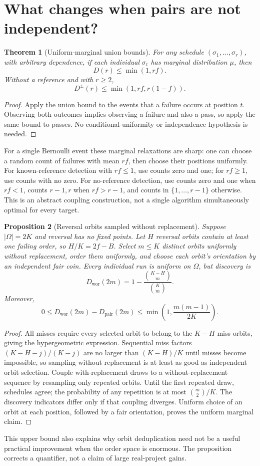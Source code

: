 \documentclass[11pt,a4paper]{article}
\newtheorem{theorem}{Theorem}[section]
\newtheorem{proposition}[theorem]{Proposition}
\theoremstyle{definition}\newtheorem{definition}[theorem]{Definition}
\theoremstyle{remark}\newtheorem{remark}[theorem]{Remark}
\newcommand{\PAIR}{\mathrm{pair}}
\theoremstyle{definition}\newtheorem{xexample}[xtheorem]{Example}\theoremstyle{plain}
\begin{document}
\section{What changes when pairs are not independent?}\label{sec:orbits}
\begin{theorem}[Uniform-marginal union bounds]\label{thm:union}
For any schedule $(\sigma_1,\ldots,\sigma_r)$, with arbitrary dependence, if each individual $\sigma_t$ has marginal distribution $\mu$, then
\[
 D(r)\le\min(1,rf).
\]
Without a reference and with $r\ge2$,
\[
 D^\pm(r)\le\min(1,rf,r(1-f)).
\]
\end{theorem}
\begin{proof}
Apply the union bound to the events that a failure occurs at position $t$. Observing both outcomes implies observing a failure and also a pass, so apply the same bound to passes. No conditional-uniformity or independence hypothesis is needed.
\end{proof}
For a single Bernoulli event these marginal relaxations are sharp: one can choose a random count of failures with mean $rf$, then choose their positions uniformly. For known-reference detection with $rf\le1$, use counts zero and one; for $rf\ge1$, use counts with no zero. For no-reference detection, use counts zero and one when $rf<1$, counts $r-1,r$ when $rf>r-1$, and counts in $\{1,\ldots,r-1\}$ otherwise. This is an abstract coupling construction, not a single algorithm simultaneously optimal for every target.

\begin{proposition}[Reversal orbits sampled without replacement]\label{prop:wor}
Suppose $|\Omega|=2K$ and reversal has no fixed points. Let $H$ reversal orbits contain at least one failing order, so $H/K=2f-B$. Select $m\le K$ distinct orbits uniformly without replacement, order them uniformly, and choose each orbit's orientation by an independent fair coin. Every individual run is uniform on $\Omega$, but discovery is
\begin{equation}\label{eq:wor}
 D_{\mathrm{wor}}(2m)=1-\frac{\binom{K-H}{m}}{\binom Km}.
\end{equation}
Moreover,
\[
 0\le D_{\mathrm{wor}}(2m)-D_{\PAIR}(2m)
 \le \min\left(1,\frac{m(m-1)}{2K}\right).
\]
\end{proposition}
\begin{proof}
All misses require every selected orbit to belong to the $K-H$ miss orbits, giving the hypergeometric expression. Sequential miss factors $(K-H-j)/(K-j)$ are no larger than $(K-H)/K$ until misses become impossible, so sampling without replacement is at least as good as independent orbit selection. Couple with-replacement draws to a without-replacement sequence by resampling only repeated orbits. Until the first repeated draw, schedules agree; the probability of any repetition is at most $\binom m2/K$. The discovery indicators differ only if that coupling diverges. Uniform choice of an orbit at each position, followed by a fair orientation, proves the uniform marginal claim.
\end{proof}
This upper bound also explains why orbit deduplication need not be a useful practical improvement when the order space is enormous. The proposition corrects a quantifier, not a claim of large real-project gains.
\end{document}

